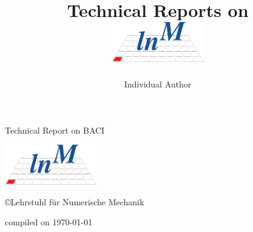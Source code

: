 \documentclass[a4paper,10pt]{report}
\title{Technical Reports on \baci{}\\
\vspace{2cm}
\includegraphics[width=0.3\textwidth]{templates/gfx/lnm-notext}
}
\author{Individual Author}
\newcommand{\baci}{\textsc{BACI}}
\begin{document}
\begin{titlepage}
\vspace{5cm}
\begin{center}
\huge{Technical Report on \baci{}}

\vspace{2cm}

\includegraphics[width=0.3\textwidth]{templates/gfx/lnm-notext}

\vspace{2cm}

\copyright{}Lehrstuhl f\"{u}r Numerische Mechanik

\vspace{2cm}

\small{compiled on \today}

\end{center}
\end{titlepage}

\tableofcontents

\newpage
\end{document}
